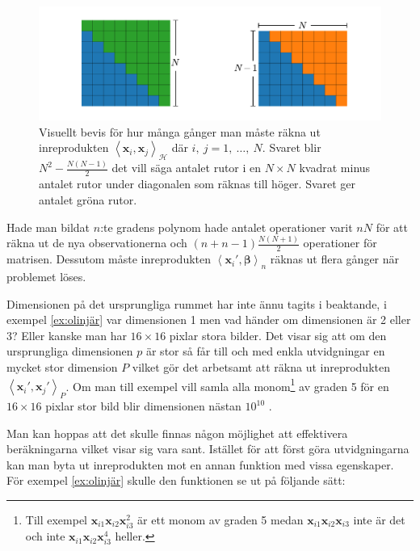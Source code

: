 \documentclass[a4paper, 12pt]{report}
\theoremstyle{definition}
\theoremstyle{remark}
\newcommand{\bfbeta}{{\boldsymbol{\beta}}}
\newcommand{\bfx}{\mathbf{x}}
\newcommand{\llangle}{\left\langle}
\newcommand{\rrangle}{\right\rangle}
\newcommand{\inner}[2]{\llangle #1, #2 \rrangle}
\newcommand{\hil}{\mathcal{H}}
\begin{document}
\begin{figure}[h]
	\centering
	\includegraphics[width=0.8\linewidth, trim={3.5cm 11mm 2.7cm 11mm}, clip]{KandFigur5.pdf}
	\caption{\label{fig:comb}Visuellt bevis för hur många gånger man måste räkna ut inreprodukten $\inner{\bfx_i}{\bfx_j}_\hil$ där $i,~j=1,~\dots,~N$. Svaret blir $N^2-\frac{N(N-1)}{2}$ det vill säga antalet rutor i en $N\times N$ kvadrat minus antalet rutor under diagonalen som räknas till höger. Svaret ger antalet gröna rutor.}
\end{figure}

Hade man bildat $n$:te gradens polynom hade antalet operationer varit $nN$ för att räkna ut de nya observationerna och $(n+n-1)\frac{N(N+1)}{2}$ operationer för matrisen. Dessutom måste inreprodukten $\inner{\bfx_i'}{\bfbeta}_n$ räknas ut flera gånger när problemet löses.

Dimensionen på det ursprungliga rummet har inte ännu tagits i beaktande, i exempel \ref{ex:olinjär} var dimensionen 1 men vad händer om dimensionen är 2 eller 3? Eller kanske man har $16\times16$ pixlar stora bilder. Det visar sig att om den ursprungliga dimensionen $p$ är stor så får till och med enkla utvidgningar en mycket stor dimension $P$ vilket gör det arbetsamt att räkna ut inreprodukten $\inner{\bfx_i'}{\bfx_j'}_P$. Om man till exempel vill samla alla monom\footnote{Till exempel $\bfx_{i1}\bfx_{i2}\bfx_{i3}^2$ är ett monom av graden 5 medan  $\bfx_{i1}\bfx_{i2}\bfx_{i3}$ inte är det och inte $\bfx_{i1}\bfx_{i2}\bfx_{i3}^4$ heller.} av graden 5 för en $16\times16$ pixlar stor bild blir dimensionen nästan $10^{10}$ \cite{LearningKernels}.

Man kan hoppas att det skulle finnas någon möjlighet att effektivera beräkningarna vilket visar sig vara sant. Istället för att först göra utvidgningarna kan man byta ut inreprodukten mot en annan funktion med vissa egenskaper. För exempel \ref{ex:olinjär} skulle den funktionen se ut på följande sätt:
	
\end{document}
